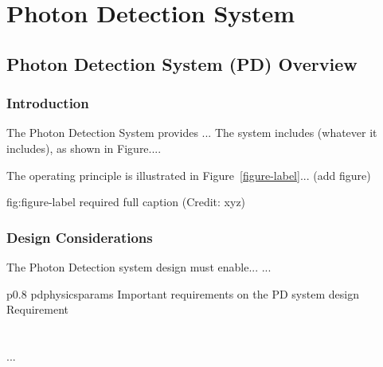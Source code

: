 \chapter{Photon Detection System}
\label{ch:fdsp-pd}

\section{Photon Detection System (PD) Overview}
\label{sec:fdsp-pd-ov}


\subsection{Introduction}
\label{sec:fdsp-pd-intro}

The Photon Detection System provides ...
The system includes (whatever it includes), as shown in Figure.... 


The operating principle is illustrated in Figure~\ref{figure-label}... (add figure)

\begin{dunefigure}{fig:figure-label}
{required full caption (Credit: xyz)}
\end{dunefigure}

\subsection{Design Considerations}
\label{sec:fdsp-pd-des-consid}


The Photon Detection system design must enable... 
...


\begin{dunetable}
{p{0.8\textwidth}}
{pdphysicsparams}
{Important requirements on the PD system design}   
Requirement  \\ \toprowrule
  \\ \colhline
   \\ \colhline
 ...\\ 
\end{dunetable}


